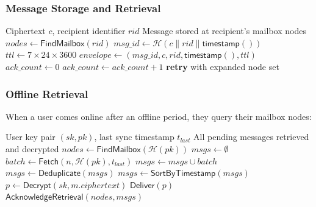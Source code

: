 \documentclass[11pt,a4paper]{article}
\newcommand{\HH}{\mathcal{H}}
\begin{document}
\subsubsection{Message Storage and Retrieval}

\begin{algorithm}[H]
\caption{DSF Message Deposit}
\label{alg:dsf-deposit}
\begin{algorithmic}[1]
\Require Ciphertext $c$, recipient identifier $\mathit{rid}$
\Ensure Message stored at recipient's mailbox nodes
\State $\mathit{nodes} \leftarrow \mathsf{FindMailbox}(\mathit{rid})$
\State $\mathit{msg\_id} \leftarrow \HH(c \| \mathit{rid} \| \mathsf{timestamp}())$
\State $\mathit{ttl} \leftarrow 7 \times 24 \times 3600$ 
\State $\mathit{envelope} \leftarrow (\mathit{msg\_id}, c, \mathit{rid}, \mathsf{timestamp}(), \mathit{ttl})$
\State $\mathit{ack\_count} \leftarrow 0$
        \State $\mathit{ack\_count} \leftarrow \mathit{ack\_count} + 1$
    \EndIf
\EndFor
{}
    \State \textbf{retry} with expanded node set
\EndIf
\end{algorithmic}
\end{algorithm}

\subsubsection{Offline Retrieval}

When a user comes online after an offline period, they query their mailbox nodes:

\begin{algorithm}[H]
\caption{DSF Message Retrieval}
\label{alg:dsf-retrieve}
\begin{algorithmic}[1]
\Require User key pair $(\mathit{sk}, \mathit{pk})$, last sync timestamp $t_{\mathit{last}}$
\Ensure All pending messages retrieved and decrypted
\State $\mathit{nodes} \leftarrow \mathsf{FindMailbox}(\HH(\mathit{pk}))$
\State $\mathit{msgs} \leftarrow \emptyset$
    \State $\mathit{batch} \leftarrow \mathsf{Fetch}(n, \HH(\mathit{pk}), t_{\mathit{last}})$
    \State $\mathit{msgs} \leftarrow \mathit{msgs} \cup \mathit{batch}$
\EndFor
\State $\mathit{msgs} \leftarrow \mathsf{Deduplicate}(\mathit{msgs})$ 
\State $\mathit{msgs} \leftarrow \mathsf{SortByTimestamp}(\mathit{msgs})$
    \State $p \leftarrow \mathsf{Decrypt}(\mathit{sk}, m.\mathit{ciphertext})$
    \State $\mathsf{Deliver}(p)$
\EndFor
\State $\mathsf{AcknowledgeRetrieval}(\mathit{nodes}, \mathit{msgs})$
\end{algorithmic}
\end{algorithm}
\end{document}
